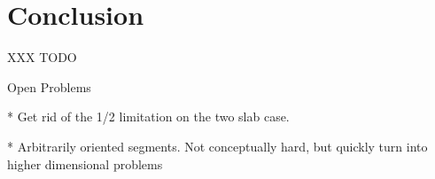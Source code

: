 \section{Conclusion}
\label{:slabs:concl}

XXX TODO

Open Problems

* Get rid of the 1/2 limitation on the two slab case.

* Arbitrarily oriented segments. Not conceptually hard, but quickly turn into higher dimensional problems

